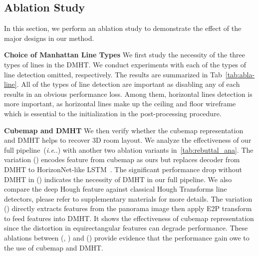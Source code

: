 \documentclass[runningheads]{llncs}
\makeatletter
\DeclareRobustCommand\onedot{\futurelet\@let@token\@onedot}
\def\@onedot{\ifx\@let@token.\else.\null\fi\xspace}
\def\ie{\emph{i.e}\onedot} \def\Ie{\emph{I.e}\onedot}
\makeatother
\begin{document}
\subsection{Ablation Study}\label{sec:ablation_result} 
In this section, we perform an ablation study to demonstrate the effect of the major designs in our method.

\noindent\textbf{Choice of Manhattan Line Types}
We first study the necessity of the three types of lines in the DMHT.
We conduct experiments with each of the types of line detection omitted, respectively. The results are summarized in Tab~\ref{tab:abla-line}. All of the types of line detection are important as disabling any of each results in an obvious performance loss. Among them, horizontal lines detection is more important, as horizontal lines make up the ceiling and floor wireframe which is essential to the initialization in the post-processing procedure.

\noindent\textbf{Cubemap and DMHT}
We then verify whether the cubemap representation and DMHT helps to recover 3D room layout.
We analyze the effectiveness of our full pipeline~(\ie \uppercase\expandafter{}) with another two ablation variants in~\cref{tab:rebuttal_ana}.
The variation (\uppercase\expandafter{}) encodes feature from cubemap as ours but replaces decoder from DMHT to HorizonNet-like LSTM~\cite{sun2019horizonnet}. 
The significant performance drop without DMHT in (\uppercase\expandafter{}) indicates the necessity of DMHT in our full pipeline.
We also compare the deep Hough feature against classical Hough Transforms line detectors, please refer to supplementary materials for more details.
The variation (\uppercase\expandafter{}) directly extracts features from the panorama image then apply E2P transform to feed features into DMHT. It shows the effectiveness of cubemap representation since the distortion in equirectangular features can degrade performance. 
These ablations between (\uppercase\expandafter{}, \uppercase\expandafter{}) and (\uppercase\expandafter{}) provide evidence that the performance gain owe to the use of cubemap and DMHT.
\end{document}
